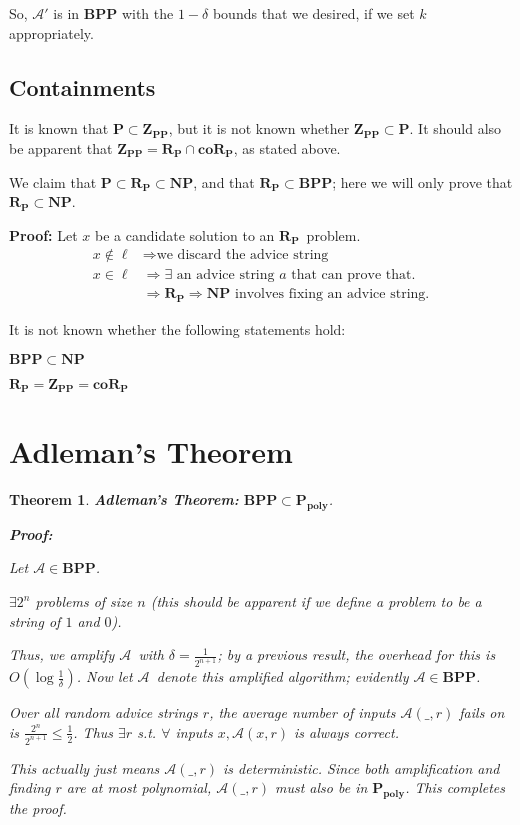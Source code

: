 \documentclass[11pt]{article}
\newcommand{\Pt}{\ensuremath{\mathbf{P}}}
\newcommand{\NP}{\ensuremath{\mathbf{NP}}}
\newcommand{\BPP}{\ensuremath{\mathbf{BPP}}}
\newcommand{\ZPP}{\ensuremath{\mathbf{Z_{PP}}}}
\newcommand{\RP}{\ensuremath{\mathbf{R_{P}}}}
\newcommand{\coRP}{\ensuremath{\mathbf{coR_{P}}}}
\newcommand{\Ppoly}{\ensuremath{\mathbf{P_{poly}}}}
\newcommand{\Alg}{\ensuremath{\mathcal{A}}}
\newtheorem{theorem}{Theorem}
\begin{document}
So, $\Alg'$ is in $\BPP$ with the $1 - \delta$ bounds that we desired, if we set $k$ appropriately.

\subsection{Containments}

It is known that $\Pt\subset\ZPP$, but it is not known whether $\ZPP\subset\Pt$.
It should also be apparent that $\ZPP = \RP\cap\coRP$, as stated above.

We claim that $\Pt\subset\RP\subset\NP$, and that $\RP\subset\BPP$; here we will only prove that $\RP\subset\NP$.

\textbf{Proof:} Let $x$ be a candidate solution to an \RP\ problem.
\begin{align*}
  x\notin\ell &\Rightarrow \text{we discard the advice string}\\
  x\in\ell &\Rightarrow \exists\text{ an advice string $a$ that can prove that.}\\
  &\Rightarrow \RP \Rightarrow \NP \text{ involves fixing an advice string.}
\end{align*}

It is not known whether the following statements hold:

$\BPP\subset\NP$

$\RP=\ZPP=\coRP$

\section{Adleman's Theorem}

\begin{theorem}
\textbf{Adleman's Theorem:} $\BPP\subset\Ppoly$.

\textbf{Proof:}

Let $\Alg\in\BPP$.

$\exists 2^n$ problems of size $n$ (this should be apparent if we define a problem to be a string of $1$ and $0$).

Thus, we amplify \Alg\ with $\delta = \frac{1}{2^{n+1}}$; by a previous result, the overhead for this is $O(\log{\frac{1}{\delta}})$. Now let \Alg\ denote this amplified algorithm; evidently $\Alg\in\BPP$.

Over all random advice strings $r$, the average number of inputs $\Alg(\_, r)$ fails on is $\frac{2^n}{2^{n+1}} \leq \frac{1}{2}$. Thus $\exists r$ s.t. $\forall$ inputs $x, \Alg(x, r)$ is always correct.

This actually just means $\Alg(\_, r)$ is deterministic. Since both amplification and finding $r$ are at most polynomial, $\Alg(\_, r)$ must also be in \Ppoly. This completes the proof.
\end{theorem}
\end{document}
